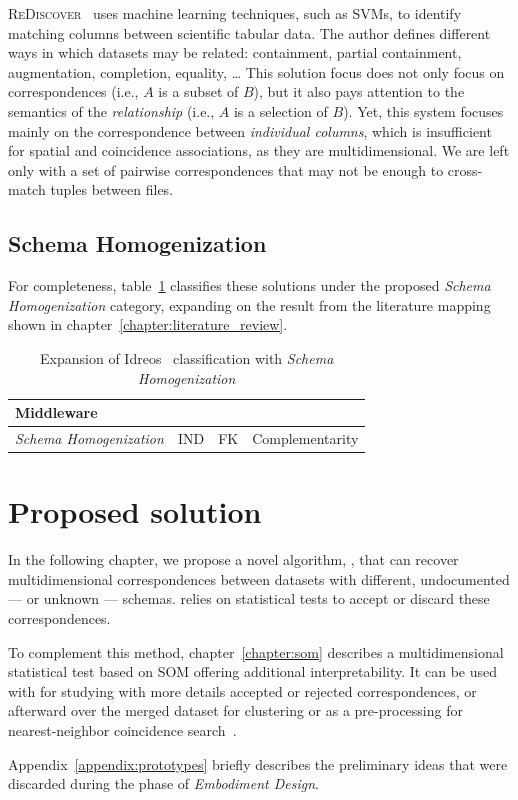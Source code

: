 \textsc{ReDiscover}~\cite{alawini2016} uses machine learning techniques, such as
\glspl{SVM}, to identify matching columns between scientific tabular data.
The author defines different ways in which datasets may be related:
containment, partial containment, augmentation, completion, equality, \ldots
This solution focus does not only focus on correspondences (i.e., $A$ is a subset of $B$),
but it also pays attention to the semantics of the \emph{relationship} (i.e., $A$
is a selection of $B$).
Yet, this system focuses mainly on the correspondence between \emph{individual columns},
which is insufficient for spatial and coincidence associations, as they are multidimensional.
We are left only with a set of pairwise correspondences that may not be enough to cross-match
tuples between files.

\subsection{Schema Homogenization}
\label{sec:schema_homogeneization}

For completeness, table~\ref{tab:missing_middleware} classifies these solutions
under the proposed \emph{Schema Homogenization} category,
expanding on the result from the literature mapping shown in chapter~\ref{chapter:literature_review}.

\begin{table}[ht]
    \centering
    \begin{tabularx}{\linewidth}{p{7em} >{\raggedright}X >{\raggedright}X X}
    \hline
    \multicolumn{4}{l}{\textbf{Middleware}} \\
    \hline
    \textit{Schema \mbox{Homogenization}} &
    \gls{IND}     \cite{DeMarchi2002,DeMarchi2003zigzag,koeller2002integration} &
    \gls{FK}      \cite{Rostin2009,Zhang2010,jiang_holistic_2020} &
    Complementarity \cite{alawini2016} \\
    \hline
    \end{tabularx}
    \caption[Articles under Schema Homogenization]{
    Expansion of Idreos~\cite{Idreos2015} classification with \emph{Schema Homogenization}}
    \label{tab:missing_middleware}
\end{table}


\section{Proposed solution}
\label{sec:gaps/proposed}
In the following chapter, we propose a novel algorithm, \PresQ, that
can recover multidimensional correspondences between datasets with different,
undocumented --- or unknown --- schemas. \PresQ relies on statistical tests to
accept or discard these correspondences.

To complement this method, chapter~\ref{chapter:som} describes a multidimensional
statistical test based on \gls{SOM} offering additional interpretability. It can be
used with \PresQ for studying with more details accepted or rejected correspondences,
or afterward over the merged dataset for clustering or as a pre-processing for nearest-neighbor
coincidence search~\cite{silva2011som}.

Appendix~\ref{appendix:prototypes} briefly describes the preliminary ideas that were
discarded during the phase of \emph{Embodiment Design}.
